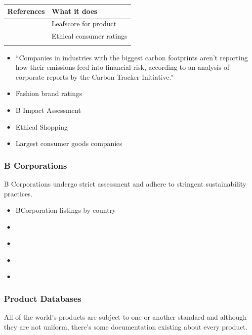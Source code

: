\documentclass[
  letterpaper,
  DIV=11,
  numbers=noendperiod]{scrartcl}
\providecommand{\tightlist}{%
  \setlength{\itemsep}{0pt}\setlength{\parskip}{0pt}}\usepackage{longtable,booktabs,array}
\begin{document}
\begin{longtable}[]{@{}ll@{}}
\toprule\noalign{}
References & What it does \\
\midrule\noalign{}
\endhead
\bottomrule\noalign{}
\endlastfoot
\citet{leafscoreLeafScoreLeadingOnline2023} & Leafscore for product \\
\citet{EthicalConsumer} & Ethical consumer ratings \\
& \\
\end{longtable}

\begin{itemize}
\item
  \citet{francesschwartzkopffFirmsArenReporting2022} ``Companies in
  industries with the biggest carbon footprints aren't reporting how
  their emissions feed into financial risk, according to an analysis of
  corporate reports by the Carbon Tracker Initiative.''
\item
  Fashion brand ratings
\item
  B Impact Assessment
\item
  Ethical Shopping
\item
  \citet{Top100Consumer} Largest consumer goods companies
\end{itemize}

\subsubsection{B Corporations}\label{b-corporations}

B Corporations undergo strict assessment and adhere to stringent
sustainability practices.

\begin{itemize}
\tightlist
\item
  \citet{FindCorp} BCorporation listings by country
\item
  \citet{EtsyMadeMistakes2017}
\item
  \citet{citywealthESGBrandingBCorps2021}
\item
  \citet{SocialEnterprisesCorps}
\item
  \citet{ravenpackCorpMovementESG2021}
\end{itemize}

\subsubsection{Product Databases}\label{product-databases}

All of the world's products are subject to one or another standard and
although they are not uniform, there's some documentation existing about
every product.
\end{document}
